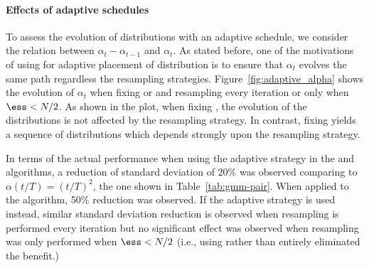\paragraph{Effects of adaptive schedules} To assess the evolution of
distributions with an adaptive schedule, we consider the relation between
$\alpha_t - \alpha_{t-1}$ and $\alpha_t$. As stated before, one of the
motivations of using \cess for adaptive placement of distribution is to
ensure that $\alpha_t$ evolves the same path regardless the resampling
strategies. Figure~\ref{fig:adaptive_alpha} shows the evolution of $\alpha_t$
when fixing \ess or \cess and resampling every iteration or only when $\ess <
N/2$. As shown in the plot, when fixing \cess, the evolution of the
distributions is not affected by the resampling strategy. In contrast, fixing
\ess yields a sequence of distributions which depends strongly upon the
resampling strategy.



In terms of the actual performance when using the \cess adaptive strategy in
the \smc[2] and \ais algorithms, a reduction of standard deviation of 20\% was
observed comparing to $\alpha(t/T) = (t/T)^2$, the one shown in
Table~\ref{tab:gmm-pair}. When applied to the \smc[3] algorithm, 50\%
reduction was observed. If the \ess adaptive strategy is used instead,
similar standard deviation reduction is observed when resampling is performed
every iteration but no significant effect was observed when resampling
was only performed when $\ess < N/2$ (i.e., using \ess rather than \cess
entirely eliminated the benefit.)


